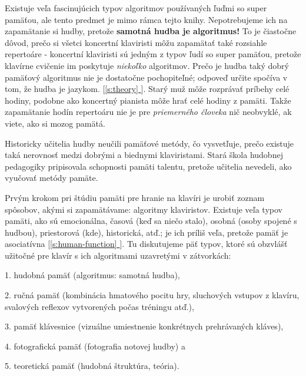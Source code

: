 \documentclass[11pt,a4paper]{book}
\newcommand*{\fullref}[1]{\hyperref[{#1}]{\ref*{#1} \nameref*{#1}}} %
\newcommand*{\fullrefp}[1]{[\fullref{#1}]} %
\begin{document}
Existuje veľa fascinujúcich typov algoritmov používaných ľuďmi so super pamäťou, ale tento predmet je mimo rámca tejto knihy. Nepotrebujeme ich na zapamätanie si hudby, pretože \textbf{samotná hudba je algoritmus!} To je čiastočne dôvod, prečo si všetci koncertní klaviristi môžu zapamätať také rozsiahle repertoáre - koncertní klaviristi sú jedným z typov ľudí so super pamäťou, pretože klavírne cvičenie im poskytuje \emph{niekoľko} algoritmov. Prečo je hudba taký dobrý pamäťový algoritmus nie je dostatočne pochopiteľné; odpoveď určite spočíva v tom, že hudba je jazykom. \fullrefp{s:theory}. Starý muž môže rozprávať príbehy celé hodiny, podobne ako koncertný pianista môže hrať celé hodiny z pamäti. Takže zapamätanie hodín repertoáru nie je pre \emph{priemerného človeka} nič neobvyklé, ak viete, ako si mozog pamätá.

Historicky učitelia hudby neučili pamäťové metódy, čo vysvetľuje, prečo existuje taká nerovnosť medzi dobrými a biednymi klaviristami. Stará škola hudobnej pedagogiky pripisovala schopnosti pamäti talentu, pretože učitelia nevedeli, ako vyučovať metódy pamäte.

Prvým krokom pri štúdiu pamäti pre hranie na klavíri je urobiť zoznam spôsobov, akými si zapamätávame: algoritmy klaviristov. Existuje veľa typov pamäti, ako sú emocionálna, časová (keď sa niečo stalo), osobná (osoby spojené s hudbou), priestorová (kde), historická, atď.; je ich príliš veľa, pretože pamäť je asociatívna \fullrefp{s:human-function}. Tu diskutujeme päť typov, ktoré sú obzvlášť užitočné pre klavír s ich algoritmami uzavretými v zátvorkách:

1. hudobná pamäť (algoritmus: samotná hudba),

2. ručná pamäť (kombinácia hmatového pocitu hry, sluchových vstupov z klavíru, svalových reflexov vytvorených počas tréningu atď.),

3. pamäť klávesnice (vizuálne umiestnenie konkrétnych prehrávaných kláves),

4. fotografická pamäť (fotografia notovej hudby) a

5. teoretická pamäť (hudobná štruktúra, teória).
\end{document}
